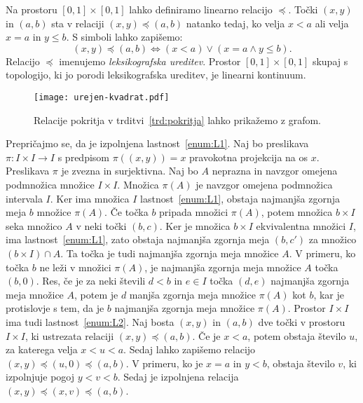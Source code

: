 \documentclass[../TG_magistrsko_delo_sections.tex]{subfiles}
\begin{document}
\begin{primer}
Na prostoru $[0, 1] \times [0, 1]$ lahko definiramo linearno relacijo $\preccurlyeq$. Točki $(x, y)$ in $(a, b)$ sta v relaciji $(x, y) \preccurlyeq (a, b)$ natanko tedaj, ko velja $x < a$ ali velja $x = a$ in $y \leq b$. S simboli lahko zapišemo:
$$(x, y) \preccurlyeq (a, b) \Leftrightarrow (x < a) \lor (x = a \land y \leq b).$$
Relacijo $\preccurlyeq$ imenujemo \emph{leksikografska ureditev}. Prostor $[0, 1] \times [0, 1]$ skupaj s topologijo, ki jo porodi leksikografska ureditev, je linearni kontinuum. 

\begin{figure}[h]
  \centering
  \texttt{[image: urejen-kvadrat.pdf]}
  \caption[Primer vektorske slike.]{Relacije pokritja v trditvi~\ref{trd:pokritja} lahko prikažemo z grafom.}
  \label{fig:varsavski_lok}
\end{figure}

Prepričajmo se, da je izpolnjena lastnost~\ref{enum:L1}. Naj bo preslikava $\pi : I \times I \to I$ s predpisom $\pi((x, y)) = x$ pravokotna projekcija na os $x$. Preslikava $\pi$ je zvezna in surjektivna. Naj bo $A$ neprazna in navzgor omejena podmnožica množice $I \times I$. Množica $\pi(A)$ je navzgor omejena podmnožica intervala $I$. Ker ima množica $I$ lastnost~\ref{enum:L1}, obstaja najmanjša zgornja meja $b$ množice $\pi(A)$. Če točka $b$ pripada množici $\pi(A)$, potem množica $b \times I$ seka množico $A$ v neki točki $(b, c)$. Ker je množica $b \times I$ ekvivalentna množici $I$, ima lastnost~\ref{enum:L1}, zato obstaja najmanjša zgornja meja $(b, c')$ za množico $(b \times I) \cap A$. Ta točka je tudi najmanjša zgornja meja množice $A$.
V primeru, ko točka $b$ ne leži v množici $\pi(A)$, je najmanjša zgornja meja množice $A$ točka $(b, 0)$. Res, če je za neki števili $d < b$ in $e \in I$ točka $(d, e)$ najmanjša zgornja meja množice $A$, potem je $d$ manjša zgornja meja množice $\pi(A)$ kot $b$, kar je protislovje s tem, da je $b$ najmanjša zgornja meja množice $\pi(A)$.
Prostor $I \times I$ ima tudi lastnost~\ref{enum:L2}. Naj bosta $(x, y)$ in $(a, b)$ dve točki v prostoru $I \times I$, ki ustrezata relaciji $(x, y) \preccurlyeq (a, b)$. Če je $x < a$, potem obstaja število $u$, za katerega velja $x<u<a$. Sedaj lahko zapišemo relacijo $(x, y) \preccurlyeq (u, 0) \preccurlyeq (a, b)$. V primeru, ko je $x=a$ in $y<b$, obstaja število $v$, ki izpolnjuje pogoj $y<v<b$. Sedaj je izpolnjena relacija $(x, y) \preccurlyeq (x, v) \preccurlyeq (a, b)$. 
\end{primer}
\end{document}
